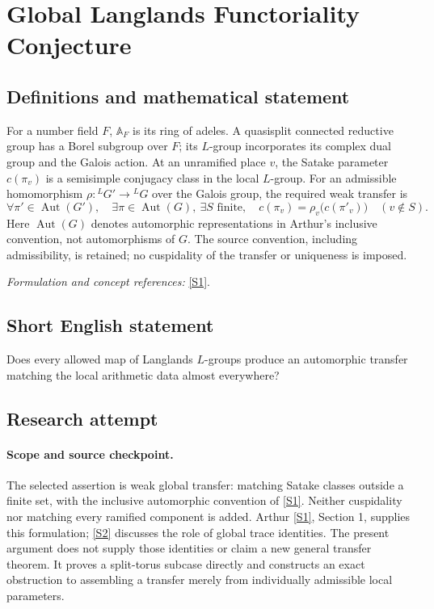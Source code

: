 \documentclass[11pt]{article}
\begin{document}
\section*{\texorpdfstring{Global Langlands Functoriality Conjecture}{Global Langlands Functoriality Conjecture}}\label{statement}
\subsection{Definitions and mathematical statement}
For a number field $F$, ${\mathbb{A}}_F$ is its ring of adeles. A quasisplit connected reductive group has a Borel subgroup over $F$; its $L$-group incorporates its complex dual group and the Galois action. At an unramified place $v$, the Satake parameter $c(\pi_v)$ is a semisimple conjugacy class in the local $L$-group. For an admissible homomorphism $\rho:{}^LG'\to{}^LG$ over the Galois group, the required weak transfer is
\[
 \forall\pi'\in\operatorname{Aut}(G'),\quad \exists\pi\in\operatorname{Aut}(G),\ \exists S\text{ finite},\quad
 c(\pi_v)=\rho_v\bigl(c(\pi'_v)\bigr)\quad(v\notin S).
\]
Here $\operatorname{Aut}(G)$ denotes automorphic representations in Arthur's inclusive convention, not automorphisms of $G$. The source convention, including admissibility, is retained; no cuspidality of the transfer or uniqueness is imposed.
\par\smallskip\textit{Formulation and concept references:} \href{https://www.claymath.org/library/cw/arthur/pdf/76.pdf}{[S1]}.

\subsection{Short English statement}
Does every allowed map of Langlands $L$-groups produce an automorphic transfer matching the local arithmetic data almost everywhere?
\subsection{Research attempt}

\paragraph{Scope and source checkpoint.}
The selected assertion is weak global transfer: matching Satake classes
outside a finite set, with the inclusive automorphic convention of \href{https://www.claymath.org/library/cw/arthur/pdf/76.pdf}{[S1]}.
Neither cuspidality nor matching every ramified component is added. Arthur
\href{https://www.claymath.org/library/cw/arthur/pdf/76.pdf}{[S1]}, Section 1, supplies this formulation; \href{https://www.math.toronto.edu/arthur/pdf/arthur-func-and-trace-formula.pdf}{[S2]} discusses the role of
global trace identities. The present argument does not supply those
identities or claim a new general transfer theorem. It proves a split-torus
subcase directly and constructs an exact obstruction to assembling a
transfer merely from individually admissible local parameters.
\end{document}
